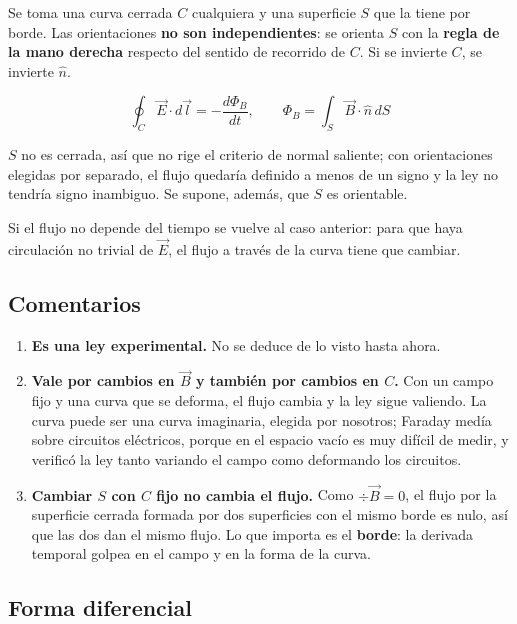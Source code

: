 \documentclass[12pt,a4paper]{article}
\begin{document}
Se toma una curva cerrada $C$ cualquiera y una superficie $S$ que la tiene por
borde. Las orientaciones \textbf{no son independientes}: se orienta $S$ con la
\textbf{regla de la mano derecha} respecto del sentido de recorrido de $C$. Si se
invierte $C$, se invierte $\hat n$.

\begin{keybox}
\[
\boxed{\ \oint_C \vec E\cdot d\vec l = -\frac{d\Phi_B}{dt},
\qquad \Phi_B = \int_S \vec B\cdot\hat n\,dS\ }
\]
\end{keybox}

\begin{notebox}
$S$ no es cerrada, así que no rige el
criterio de normal saliente; con orientaciones elegidas por separado, el
flujo quedaría definido a menos de un signo y la ley no tendría signo
inambiguo. Se supone, además, que $S$ es orientable.
\end{notebox}

Si el flujo no depende del tiempo se vuelve al caso anterior: para que haya
circulación no trivial de $\vec E$, el flujo a través de la curva tiene que
cambiar.

\subsection{Comentarios}

\begin{enumerate}
  \item \textbf{Es una ley experimental.} No se deduce de lo visto hasta ahora.
  \item \textbf{Vale por cambios en $\vec B$ y también por cambios en $C$.} Con un campo
  fijo y una curva que se deforma, el flujo cambia y la ley sigue valiendo. La
  curva puede ser una curva imaginaria, elegida por nosotros; Faraday medía
  sobre circuitos eléctricos, porque en el espacio vacío es muy difícil de
  medir, y verificó la ley tanto variando el campo como deformando los
  circuitos.
  \item \textbf{Cambiar $S$ con $C$ fijo no cambia el flujo.} Como $\div\vec B = 0$, el
  flujo por la superficie cerrada formada por dos superficies con el mismo
  borde es nulo, así que las dos dan el mismo flujo. Lo que importa es el
  \textbf{borde}: la derivada temporal golpea en el campo y en la forma de la
  curva.
\end{enumerate}

\subsection{Forma diferencial}
\end{document}
